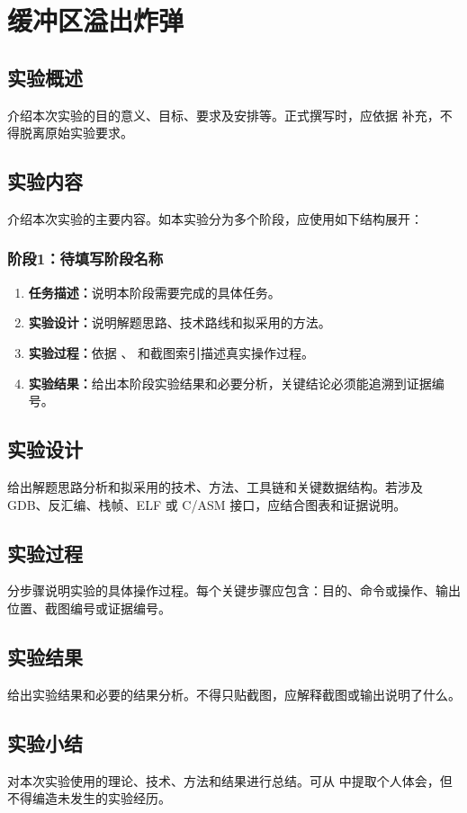 \section{缓冲区溢出炸弹}

\subsection{实验概述}

介绍本次实验的目的意义、目标、要求及安排等。正式撰写时，应依据  补充，不得脱离原始实验要求。

\subsection{实验内容}

介绍本次实验的主要内容。如本实验分为多个阶段，应使用如下结构展开：

\subsubsection{阶段1：待填写阶段名称}

\begin{enumerate}[label=\arabic*.]
    \item \textbf{任务描述：}说明本阶段需要完成的具体任务。
    \item \textbf{实验设计：}说明解题思路、技术路线和拟采用的方法。
    \item \textbf{实验过程：}依据 、 和截图索引描述真实操作过程。
    \item \textbf{实验结果：}给出本阶段实验结果和必要分析，关键结论必须能追溯到证据编号。
\end{enumerate}

\subsection{实验设计}

给出解题思路分析和拟采用的技术、方法、工具链和关键数据结构。若涉及 GDB、反汇编、栈帧、ELF 或 C/ASM 接口，应结合图表和证据说明。

\subsection{实验过程}

分步骤说明实验的具体操作过程。每个关键步骤应包含：目的、命令或操作、输出位置、截图编号或证据编号。

\subsection{实验结果}

给出实验结果和必要的结果分析。不得只贴截图，应解释截图或输出说明了什么。

\subsection{实验小结}

对本次实验使用的理论、技术、方法和结果进行总结。可从  中提取个人体会，但不得编造未发生的实验经历。
